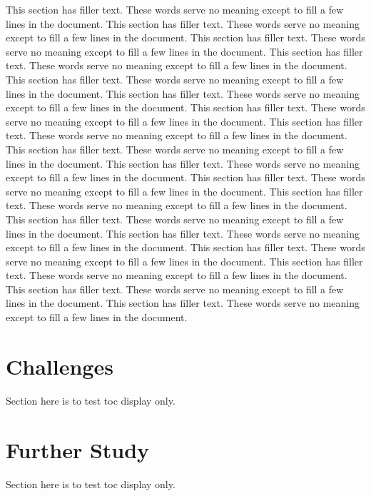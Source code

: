 This section has filler text. These words serve no meaning except to fill a few lines in the document. This section has filler text. These words serve no meaning except to fill a few lines in the document. This section has filler text. These words serve no meaning except to fill a few lines in the document. This section has filler text. These words serve no meaning except to fill a few lines in the document. This section has filler text. These words serve no meaning except to fill a few lines in the document. This section has filler text. These words serve no meaning except to fill a few lines in the document. This section has filler text. These words serve no meaning except to fill a few lines in the document. This section has filler text. These words serve no meaning except to fill a few lines in the document. This section has filler text. These words serve no meaning except to fill a few lines in the document. This section has filler text. These words serve no meaning except to fill a few lines in the document. This section has filler text. These words serve no meaning except to fill a few lines in the document. This section has filler text. These words serve no meaning except to fill a few lines in the document. This section has filler text. These words serve no meaning except to fill a few lines in the document. This section has filler text. These words serve no meaning except to fill a few lines in the document. This section has filler text. These words serve no meaning except to fill a few lines in the document. This section has filler text. These words serve no meaning except to fill a few lines in the document. This section has filler text. These words serve no meaning except to fill a few lines in the document. This section has filler text. These words serve no meaning except to fill a few lines in the document.

\section{Challenges}
Section here is to test toc display only.

\section{Further Study}
Section here is to test toc display only.
